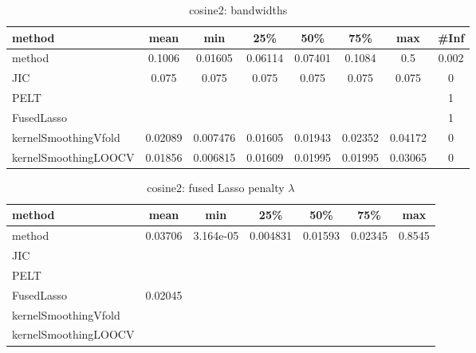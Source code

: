 \begin{table}[ht]
\centering
\begin{tabular}{l|c|ccccc|c}
  \hline
method & mean & min & 25\% & 50\% & 75\% & max & \#Inf \\ 
  \hline
method & 0.1006 & 0.01605 & 0.06114 & 0.07401 & 0.1084 &   0.5 & 0.002 \\ 
  JIC & 0.075 & 0.075 & 0.075 & 0.075 & 0.075 & 0.075 &   0 \\ 
  PELT &  &  &  &  &  &  &   1 \\ 
  FusedLasso &  &  &  &  &  &  &   1 \\ 
  kernelSmoothingVfold & 0.02089 & 0.007476 & 0.01605 & 0.01943 & 0.02352 & 0.04172 &   0 \\ 
  kernelSmoothingLOOCV & 0.01856 & 0.006815 & 0.01609 & 0.01995 & 0.01995 & 0.03065 &   0 \\ 
   \hline
\end{tabular}
\caption{cosine2: bandwidths} 
\label{tab:cosine2Bandwidths}
\end{table}
\begin{table}[ht]
\centering
\begin{tabular}{l|c|ccccc}
  \hline
method & mean & min & 25\% & 50\% & 75\% & max \\ 
  \hline
method & 0.03706 & 3.164e-05 & 0.004831 & 0.01593 & 0.02345 & 0.8545 \\ 
  JIC &  &  &  &  &  &  \\ 
  PELT &  &  &  &  &  &  \\ 
  FusedLasso & 0.02045 &  &  &  &  &  \\ 
  kernelSmoothingVfold &  &  &  &  &  &  \\ 
  kernelSmoothingLOOCV &  &  &  &  &  &  \\ 
   \hline
\end{tabular}
\caption{cosine2: fused Lasso penalty $\lambda$} 
\label{tab:cosine2Lambdas}
\end{table}
